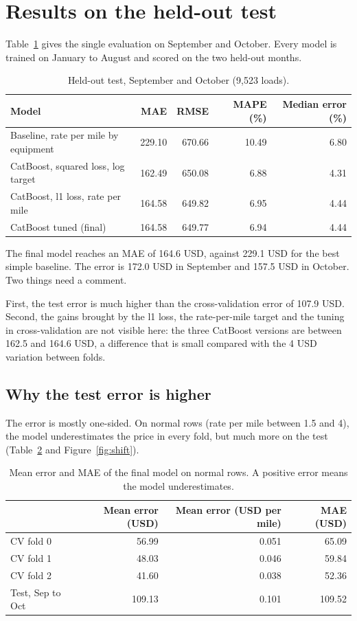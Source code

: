 \documentclass[a4paper,11pt]{article}
\begin{document}
\section{Results on the held-out test}

Table~\ref{tab:test} gives the single evaluation on September and October. Every model is trained on January to August and scored on the two held-out months.

\begin{table}[htbp]
\centering
\caption{Held-out test, September and October (9,523 loads).}
\label{tab:test}
\small
\begin{tabular}{lrrrr}
\toprule
Model & MAE & RMSE & MAPE (\%) & Median error (\%) \\
\midrule
Baseline, rate per mile by equipment & 229.10 & 670.66 & 10.49 & 6.80 \\
CatBoost, squared loss, log target & 162.49 & 650.08 & 6.88 & 4.31 \\
CatBoost, l1 loss, rate per mile & 164.58 & 649.82 & 6.95 & 4.44 \\
CatBoost tuned (final) & 164.58 & 649.77 & 6.94 & 4.44 \\
\bottomrule
\end{tabular}
\end{table}

The final model reaches an MAE of 164.6 USD, against 229.1 USD for the best simple baseline. The error is 172.0 USD in September and 157.5 USD in October. Two things need a comment.

First, the test error is much higher than the cross-validation error of 107.9 USD. Second, the gains brought by the l1 loss, the rate-per-mile target and the tuning in cross-validation are not visible here: the three CatBoost versions are between 162.5 and 164.6 USD, a difference that is small compared with the 4 USD variation between folds.

\subsection{Why the test error is higher}

The error is mostly one-sided. On normal rows (rate per mile between 1.5 and 4), the model underestimates the price in every fold, but much more on the test (Table~\ref{tab:bias} and Figure~\ref{fig:shift}).

\begin{table}[htbp]
\centering
\caption{Mean error and MAE of the final model on normal rows. A positive error means the model underestimates.}
\label{tab:bias}
\small
\begin{tabular}{lrrr}
\toprule
 & Mean error (USD) & Mean error (USD per mile) & MAE (USD) \\
\midrule
CV fold 0 & 56.99 & 0.051 & 65.09 \\
CV fold 1 & 48.03 & 0.046 & 59.84 \\
CV fold 2 & 41.60 & 0.038 & 52.36 \\
Test, Sep to Oct & 109.13 & 0.101 & 109.52 \\
\bottomrule
\end{tabular}
\end{table}
\end{document}
